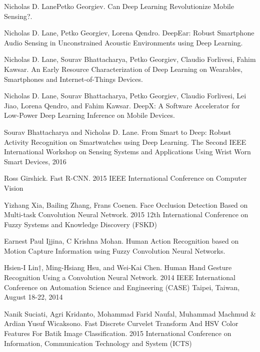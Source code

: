 %
% 

% 
% 
\begin{thebibliography}{4}
 Nicholas D. LanePetko Georgiev. Can Deep Learning Revolutionize Mobile Sensing?.

 Nicholas D. Lane, Petko Georgiev, Lorena Qendro. DeepEar: Robust Smartphone Audio Sensing in Unconstrained Acoustic Environments using Deep Learning.

 Nicholas D. Lane, Sourav Bhattacharya, Petko Georgiev, Claudio Forlivesi, Fahim Kawsar. An Early Resource Characterization of Deep Learning on Wearables, Smartphones and Internet-of-Things Devices.

 Nicholas D. Lane, Sourav Bhattacharya, Petko Georgiev, Claudio Forlivesi, Lei Jiao, Lorena Qendro, and Fahim Kawsar. DeepX: A Software Accelerator for Low-Power Deep Learning Inference on Mobile Devices.

 Sourav Bhattacharya and Nicholas D. Lane. From Smart to Deep: Robust Activity Recognition on Smartwatches using Deep Learning. The Second IEEE International Workshop on Sensing Systems and Applications Using Wrist Worn Smart Devices, 2016

 Ross Girshick. Fast R-CNN. 2015 IEEE International Conference on Computer Vision

 Yizhang Xia, Bailing Zhang, Frans Coenen. Face Occlusion Detection Based on Multi-task Convolution Neural Network. 2015 12th International Conference on Fuzzy Systems and Knowledge Discovery (FSKD)

 Earnest Paul Ijjina, C Krishna Mohan. Human Action Recognition based on Motion Capture Information using Fuzzy Convolution Neural Networks. 

 Hsien-I Lin†, Ming-Hsiang Hsu, and Wei-Kai Chen. Human Hand Gesture Recognition Using a Convolution Neural Network. 2014 IEEE International Conference on Automation Science and Engineering (CASE) Taipei, Taiwan, August 18-22, 2014

 Nanik Suciati, Agri Kridanto, Mohammad Farid Naufal, Muhammad Machmud \& Ardian Yusuf Wicaksono. Fast Discrete Curvelet Transform And HSV Color Features For Batik Image Classification. 2015 International Conference on Information, Communication Technology and System (ICTS)


\end{thebibliography}

